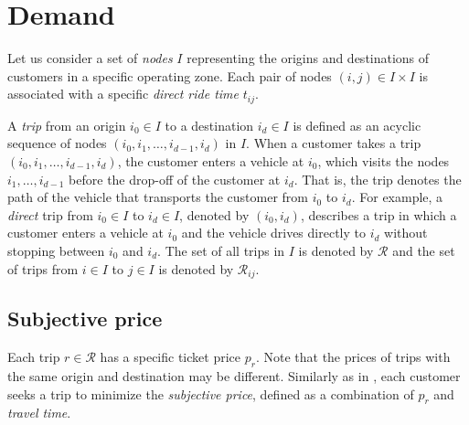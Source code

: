 \documentclass[dissertation,draft*]{aaltoseries}
\begin{document}

\section{Demand}
\label{demand}
Let us consider a set of \emph{nodes} $I$ representing the origins and destinations of customers in a specific operating zone.
Each pair of nodes $(i,j) \in I \times I$ is associated with a specific \emph{direct ride time} $t_{ij}$.

A \emph{trip} from an origin $i_0 \in I$ to a destination $i_d \in I$ is defined as an acyclic sequence of nodes 
$(i_0,i_1,\ldots,i_{d-1},i_d)$ in $I$.
When a customer takes a trip $(i_0,i_1,\ldots,i_{d-1},i_d)$, the customer enters a vehicle at $i_0$, which
visits the nodes $i_1,\ldots,i_{d-1}$ before the drop-off of the customer at $i_d$. That is, the
trip denotes the path of the vehicle that transports the customer from $i_0$ to $i_d$.
For example, a \emph{direct} trip from $i_0 \in I$ to $i_d \in I$, denoted by $(i_0,i_d)$, describes a trip in which a customer enters 
a vehicle at $i_0$ and the vehicle drives directly to $i_d$ without stopping between $i_0$ and $i_d$. 
The set of all trips in $I$ is denoted by $\mathcal{R}$ and the set of trips from $i\in I$ to $j \in I$ is denoted by $\mathcal{R}_{ij}$.

\subsection{Subjective price}
Each trip $r \in \mathcal{R}$ has a specific ticket price $p_r$. 
Note that the prices of trips with the same origin and destination may be different.
Similarly as in \citep{yang2010}, each customer seeks a trip to minimize the \emph{subjective price}, 
defined as a combination of $p_r$ and \emph{travel time}. 

\end{document}
